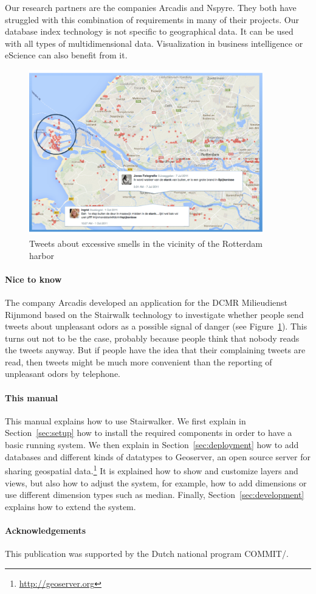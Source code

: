 Our research partners are the companies Arcadis and Nspyre. They both have
struggled with this combination of requirements in many of their projects.
Our database index technology is not specific to geographical data. It can
be used with all types of multidimensional data. Visualization in business
intelligence or eScience can also benefit from it.

\begin{figure}[t]
\centering
\includegraphics[width=4in]{Figures/DCMR-screenshot.pdf}
\caption{Tweets about excessive smells in the vicinity of the Rotterdam
harbor}
\label{fig:DCMR-screenshot}
\end{figure}

\paragraph{Nice to know}
The company Arcadis developed an application for the DCMR Milieudienst
Rijnmond based on the Stairwalk technology to investigate whether people
send tweets about unpleasant odors as a possible signal of danger (see
Figure~\ref{fig:DCMR-screenshot}). This turns out not to be the case,
probably because people think that nobody reads the tweets anyway. But if
people have the idea that their complaining tweets are read, then tweets
might be much more convenient than the reporting of unpleasant odors by
telephone.

\paragraph{This manual}

This manual explains how to use Stairwalker.  We first explain in
Section~\ref{sec:setup} how to install the required components in order to
have a basic running system.  We then explain in
Section~\ref{sec:deployment} how to add databases and different kinds of
datatypes to Geoserver, an open source server for sharing geospatial
data.\footnote{\url{http://geoserver.org}} It is explained how to show and
customize layers and views, but also how to adjust the system, for example,
how to add dimensions or use different dimension types such as median.
Finally, Section~\ref{sec:development} explains how to extend the system.

\paragraph{Acknowledgements}

This publication was supported by the Dutch national program COMMIT/.
